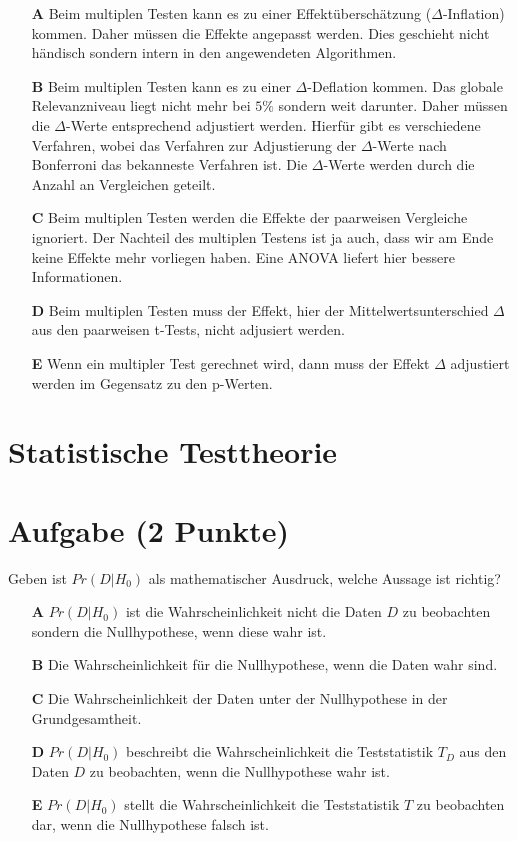 \documentclass[a4paper, 9pt]{scrartcl}\usepackage[]{graphicx}\usepackage[]{xcolor}
\begin{document}
\begin{enumerate}
\item [\textbf{A} \msquare] Beim multiplen Testen kann es zu einer Effektüberschätzung ($\Delta$-Inflation) kommen. Daher müssen die Effekte angepasst werden. Dies geschieht nicht händisch sondern intern in den angewendeten Algorithmen.
\item [\textbf{B} \msquare] Beim multiplen Testen kann es zu einer $\Delta$-Deflation kommen. Das globale Relevanzniveau liegt nicht mehr bei $5\%$ sondern weit darunter. Daher müssen die $\Delta$-Werte entsprechend adjustiert werden. Hierfür gibt es verschiedene Verfahren, wobei das Verfahren zur Adjustierung der $\Delta$-Werte nach Bonferroni das bekanneste Verfahren ist. Die $\Delta$-Werte werden durch die Anzahl an Vergleichen geteilt.
\item [\textbf{C} \msquare] Beim multiplen Testen werden die Effekte der paarweisen Vergleiche ignoriert. Der Nachteil des multiplen Testens ist ja auch, dass wir am Ende keine Effekte mehr vorliegen haben. Eine ANOVA liefert hier bessere Informationen.
\item [\textbf{D} \msquare] Beim multiplen Testen muss der Effekt, hier der Mittelwertsunterschied $\Delta$ aus den paarweisen t-Tests, nicht adjusiert werden.
\item [\textbf{E} \msquare] Wenn ein multipler Test gerechnet wird, dann muss der Effekt $\Delta$ adjustiert werden im Gegensatz zu den p-Werten.
\end{enumerate}
\section*{Statistische Testtheorie}  

\section{Aufgabe \hfill (2 Punkte)}




Geben ist $Pr(D|H_0)$ als mathematischer Ausdruck, welche Aussage ist richtig?



\begin{enumerate}
\item [\textbf{A} \msquare] $Pr(D|H_0)$ ist die Wahrscheinlichkeit nicht die Daten $D$ zu beobachten sondern die Nullhypothese, wenn diese wahr ist.
\item [\textbf{B} \msquare] Die Wahrscheinlichkeit für die Nullhypothese, wenn die Daten wahr sind.
\item [\textbf{C} \msquare] Die Wahrscheinlichkeit der Daten unter der Nullhypothese in der Grundgesamtheit.
\item [\textbf{D} \msquare] $Pr(D|H_0)$ beschreibt die Wahrscheinlichkeit die Teststatistik $T_D$ aus den Daten $D$ zu beobachten, wenn die Nullhypothese wahr ist.
\item [\textbf{E} \msquare] $Pr(D|H_0)$ stellt die Wahrscheinlichkeit die Teststatistik $T$ zu beobachten dar, wenn die Nullhypothese falsch ist.
\end{enumerate}
\end{document}
